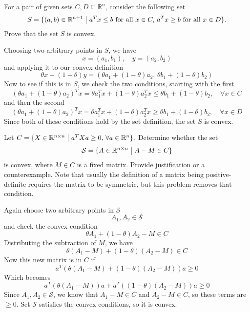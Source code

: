 \documentclass[11pt]{article}
\begin{document}
\begin{homeworkProblem}

For a pair of given sets $C, D \subseteq \mathbb{R}^n$, consider the following set
\[
    S = \{(a, b) \in \mathbb{R}^{n + 1} \bigm\vert a^T x \leq b \text{ for all } x \in C, \, a^T x \geq b \text{ for all } x \in D\}.
\] Prove that the set $S$ is convex. \vspace{1\baselineskip}

\solution

Choosing two arbitrary points in $S$, we have
\[
    x = (a_1, b_1), \quad y = (a_2, b_2)
\]
and applying it to our convex definition
\[
    \theta x + (1 - \theta) y = (\theta a_1 + (1 - \theta) a_2, \, \theta b_1 + (1 - \theta) b_2)
\]
Now to see if this is in $S$, we check the two conditions, starting with the first
\[
    (\theta a_1 + (1 - \theta) a_2)^T x = \theta a_1^T x + (1-\theta) a_2^T x \leq \theta b_1 + (1 - \theta) b_2, \quad \forall x \in C
\]
and then the second
\[
    (\theta a_1 + (1 - \theta) a_2)^T x = \theta a_1^T x + (1-\theta) a_2^T x \geq \theta b_1 + (1 - \theta) b_2, \quad \forall x \in D
\]
Since both of these conditions hold by the set definition, the set $S$ is convex.

\end{homeworkProblem}

\pagebreak

\begin{homeworkProblem}

Let $C = \{X \in \mathbb{R}^{n \times n} \bigm\vert a^T X a \geq 0, \, \forall a \in \mathbb{R}^n \}$. Determine whether the set
\[
    \mathcal{S} = \{A \in \mathbb{R}^{n \times n} \bigm\vert A - M \in C \}
\]
is convex, where $M \in C$ is a fixed matrix. Provide justification or a counterexample. Note that usually the definition of a 
matrix being positive-definite requires the matrix to be symmetric, but this problem removes that condition. \vspace{1\baselineskip}

\solution

Again choose two arbitrary points in $\mathcal{S}$
\[
    A_1, A_2 \in \mathcal{S}
\]
and check the convex condition
\[
    \theta A_1 + (1 - \theta) A_2 - M \in C
\]
Distributing the subtraction of $M$, we have
\[
    \theta (A_1 - M) + (1 - \theta)(A_2 - M) \in C
\]
Now this new matrix is in $C$ if 
\[
    a^T(\theta(A_1 - M) + (1 - \theta)(A_2 - M)) a \geq 0 
\]
Which becomes
\[
    a^T (\theta(A_1 - M)) a + a^T((1 - \theta)(A_2 - M)) a \geq 0
\]
Since $A_1, A_2 \in \mathcal{S}$, we know that $A_1 - M \in C$ and $A_2 - M \in C$, so these terms are $\geq 0$. Set $\mathcal{S}$ satisfies the convex conditions, so it is convex.

\end{homeworkProblem}
\end{document}
